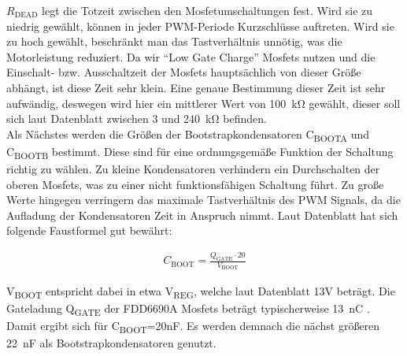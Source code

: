 $R_{\text{DEAD}}$ legt die Totzeit zwischen den Mosfetumschaltungen fest. Wird sie zu niedrig gewählt, können in jeder PWM-Periode Kurzschlüsse auftreten. Wird sie zu hoch
gewählt, beschränkt man das Tastverhältnis unnötig, was die Motorleistung reduziert. Da wir ``Low Gate Charge'' Mosfets nutzen und die Einschalt- bzw. Ausschaltzeit
der Mosfets hauptsächlich von dieser Größe abhängt, ist diese Zeit sehr klein. Eine genaue Bestimmung dieser Zeit ist sehr aufwändig, deswegen
wird hier ein mittlerer Wert von \SI{100}{\kilo\ohm} gewählt, dieser soll sich laut Datenblatt zwischen 3 und \SI{240}{\kilo\ohm} befinden.\\


%
% 
% 
% 



Als Nächstes werden die Größen der Bootstrapkondensatoren C\textsubscript{BOOTA} und C\textsubscript{BOOTB} bestimmt. Diese sind für eine ordnungsgemäße
Funktion der Schaltung richtig zu wählen. Zu kleine Kondensatoren verhindern ein Durchschalten der oberen Mosfets, was zu einer nicht funktionsfähigen Schaltung
führt. Zu große Werte hingegen verringern das maximale Tastverhältnis des PWM Signals, da die Aufladung der Kondensatoren Zeit in Anspruch nimmt.
Laut Datenblatt hat sich folgende Faustformel gut bewährt:

\begin{align*}
C_{\text{BOOT}}=\frac{Q_{\text{GATE}}\cdot20}{V_{\text{BOOT}}}
\end{align*}


V\textsubscript{BOOT} entspricht dabei in etwa V\textsubscript{REG}, welche laut Datenblatt \cite{ds-A3941} 13V beträgt.
Die Gateladung Q\textsubscript{GATE} der FDD6690A Mosfets beträgt typischerweise \SI{13}{\nano\coulomb} \cite{ds-fs}. Damit ergibt sich für C\textsubscript{BOOT}=20nF. Es werden demnach
die nächst größeren \SI{22}{\nano\farad} als Bootstrapkondensatoren genutzt.\\

